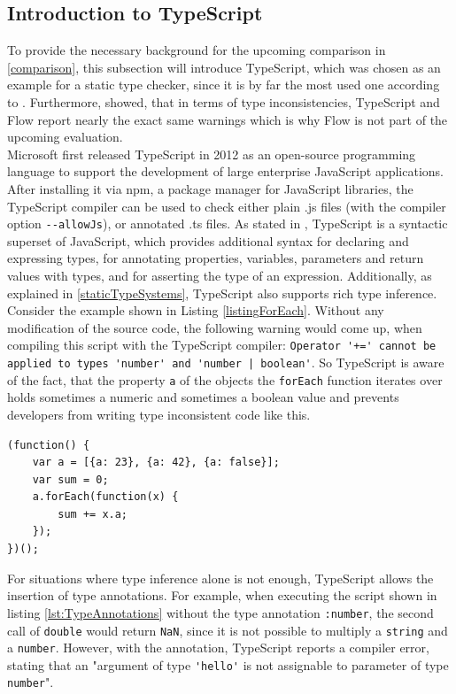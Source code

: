 \documentclass[runningheads,a4paper]{llncs}
\begin{document}
\subsection{Introduction to TypeScript} \label{IntroToTS}
To provide the necessary background for the upcoming comparison in \ref{comparison}, this subsection will introduce TypeScript, which was chosen as an example for a static type checker, since it is by far the most used one according to \cite{StateOfJs}.
Furthermore, \cite{DBLP:conf/icse/GaoBB17} showed, that in terms of type inconsistencies, TypeScript and Flow report nearly the exact same warnings which is why Flow is not part of the upcoming evaluation.\\
Microsoft first released TypeScript in 2012 as an open-source programming language to support the development of large enterprise JavaScript applications. 
After installing it via npm, a package manager for JavaScript libraries, the TypeScript compiler can be used to check either plain .js files (with the compiler option  \lstinline[columns=fixed]{--allowJs}), or annotated .ts files.
As stated in \cite{DBLP:conf/ecoop/BiermanAT14}, TypeScript is a syntactic superset of JavaScript, which provides additional syntax for declaring and expressing types, for annotating properties, variables, parameters and return values with types, and for asserting the type of an expression.
Additionally, as explained in \ref{staticTypeSystems}, TypeScript also supports rich type inference.
Consider the example shown in Listing \ref{listingForEach}.
Without any modification of the source code, the following warning would come up, when compiling this script with the TypeScript compiler:
\lstinline[columns=fixed]{Operator '+=' cannot be applied to types 'number' and 'number | boolean'}.
So TypeScript is aware of the fact, that the property \lstinline[columns=fixed]{a} of the objects the \lstinline[columns=fixed]{forEach} function iterates over holds sometimes a numeric and sometimes a boolean value and prevents developers from writing type inconsistent code like this.

\medskip\medskip
\lstset{language=javascript}
\begin{minipage}{\linewidth}
\begin{lstlisting}[frame=single, caption=Inconsistent ForEach, label=listingForEach]
(function() {
    var a = [{a: 23}, {a: 42}, {a: false}];
    var sum = 0;
    a.forEach(function(x) {
        sum += x.a;
    });
})();
\end{lstlisting}
\end{minipage}
For situations where type inference alone is not enough, TypeScript allows the insertion of type annotations.
For example, when executing the script shown in listing \ref{lst:TypeAnnotations} without the type annotation \lstinline[columns=fixed]{:number}, the second call of \lstinline[columns=fixed]{double} would return \lstinline[columns=fixed]{NaN}, since it is not possible to multiply a \lstinline[columns=fixed]{string} and a \lstinline[columns=fixed]{number}.
However, with the annotation, TypeScript reports a compiler error, stating that an "argument of type \lstinline[columns=fixed]{'hello'} is not assignable to parameter of type \lstinline[columns=fixed]{number}".
\end{document}
